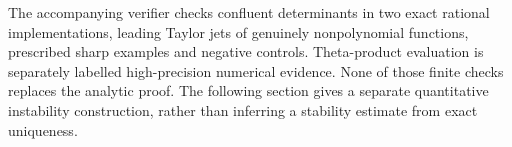 The accompanying verifier checks confluent determinants in two exact rational
implementations, leading Taylor jets of genuinely nonpolynomial functions,
prescribed sharp examples and negative controls. Theta-product evaluation is
separately labelled high-precision numerical evidence. None of those finite
checks replaces the analytic proof. The following section gives a separate
quantitative instability construction, rather than inferring a stability
estimate from exact uniqueness.
